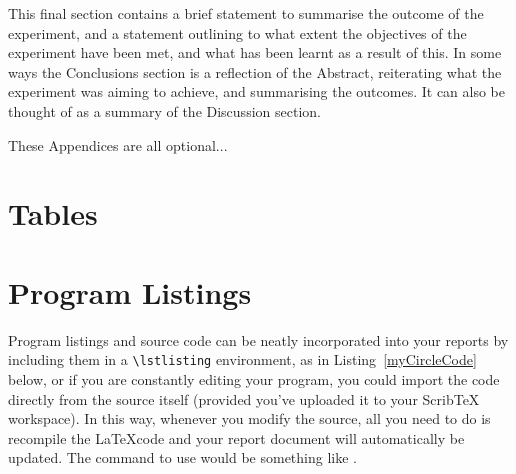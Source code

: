 \documentclass[11pt, a4paper]{article}
\begin{document}
This final section contains a brief statement to summarise the outcome of the experiment, and a statement outlining to what extent the objectives of the experiment have been met, and what has been learnt as a result of this. In some ways the Conclusions section is a reflection of the Abstract, reiterating what the experiment was aiming to achieve, and summarising the outcomes. It can also be thought of as a summary of the Discussion section.

%






\newpage
\appendix
\appendixpage
\addappheadtotoc

These Appendices are all optional...

\section{Tables}


\section{Program Listings}

Program listings and source code can be neatly incorporated into your reports by including them in a \verb|\lstlisting| environment, as in Listing~\ref{myCircleCode} below, or if you are constantly editing your program, you could import the code directly from the source itself (provided you've uploaded it to your ScribTeX workspace). In this way, whenever you modify the source, all you need to do is recompile the \LaTeX code and your report document will automatically be updated. The command to use would be something like \verb||.
\end{document}
